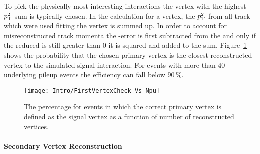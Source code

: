 To pick the physically most interesting interactions the vertex with the highest $p_{\mathrm{T}}^{2}$ sum is typically chosen. In the calculation for a vertex, the $p_{\mathrm{T}}^{2}$ from all track which were used fitting the vertex is summed up. In order to account for misreconstructed track momenta the \pt-error is first subtracted from the \pt and only if the reduced \pt is still greater than 0 it is squared and added to the sum. Figure~\ref{plot:IntroSigVertexProb} shows the probability that the chosen primary vertex is the closest reconstructed vertex to the simulated signal interaction. For events with more than 40 underlying pileup events the efficiency can fall below $90\,{}\%{}$.

\begin{figure}[!Hhtb]
    \centering
    \texttt{[image: Intro/FirstVertexCheck\_Vs\_Npu]}
    \caption[Probability to define the correct vertex as signal]{The percentage for events in which the correct primary vertex is defined as the signal vertex as a function of number of reconstructed vertices. \label{plot:IntroSigVertexProb}}
\end{figure}

\paragraph{Secondary Vertex Reconstruction}

